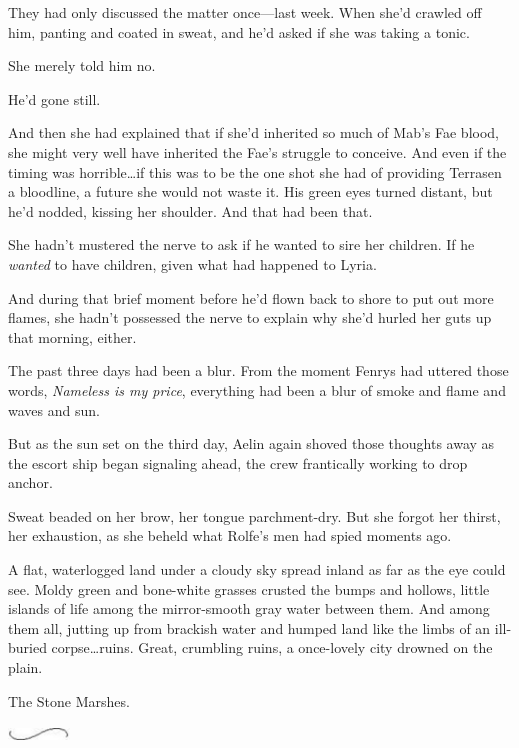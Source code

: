 They had only discussed the matter once---last week.
When she'd crawled off him, panting and coated in sweat, and he'd asked if she was taking a tonic.

She merely told him no.

He'd gone still.

And then she had explained that if she'd inherited so much of Mab's Fae blood, she might very well have inherited the Fae's struggle to conceive.
And even if the timing was horrible\ldots if this was to be the one shot she had of providing Terrasen a bloodline, a future  she would not waste it.
His green eyes turned distant, but he'd nodded, kissing her shoulder.
And that had been that.

She hadn't mustered the nerve to ask if he wanted to sire her children.
If he \emph{wanted} to have children, given what had happened to Lyria.

And during that brief moment before he'd flown back to shore to put out more flames, she hadn't possessed the nerve to explain why she'd hurled her guts up that morning, either.

The past three days had been a blur.
From the moment Fenrys had uttered those words, \emph{Nameless is my price}, everything had been a blur of smoke and flame and waves and sun.

But as the sun set on the third day, Aelin again shoved those thoughts away as the escort ship began signaling ahead, the crew frantically working to drop anchor.

Sweat beaded on her brow, her tongue parchment-dry.
But she forgot her thirst, her exhaustion, as she beheld what Rolfe's men had spied moments ago.

A flat, waterlogged land under a cloudy sky spread inland as far as the eye could see.
Moldy green and bone-white grasses crusted the bumps and hollows, little islands of life among the mirror-smooth gray water between them.
And among them all, jutting up from brackish water and humped land like the limbs of an ill-buried corpse\ldots ruins.
Great, crumbling ruins, a once-lovely city drowned on the plain.

The Stone Marshes.

\begin{center}
	\includegraphics[width=0.65in,height=0.13in]{images/seperator}
\end{center}

